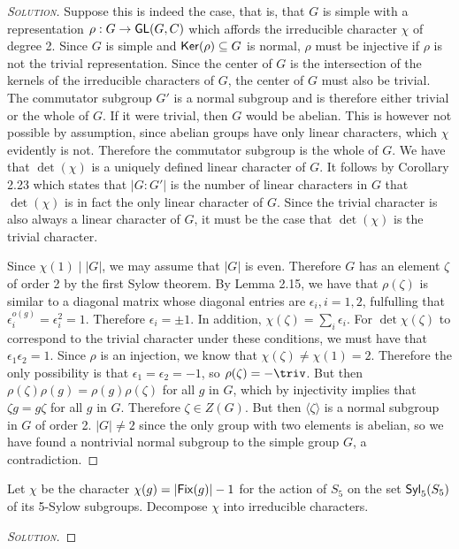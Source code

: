 \begin{proof}[{\scshape Solution}]
Suppose this is indeed the case, that is, that $G$ is simple with a representation $\rho: G \to \mathsf{GL}(G, C)$ which affords the irreducible character $\chi$ of degree 2. Since $G$ is simple and $\mathsf{Ker}(\rho) \subseteq G$ is normal, $\rho$ must be injective if $\rho$ is not the trivial representation. Since the center of $G$ is the intersection of the kernels of the irreducible characters of $G$, the center of $G$ must also be trivial. The commutator subgroup $G'$ is a normal subgroup and is therefore either trivial or the whole of $G$. If it were trivial, then $G$ would be abelian. This is however not possible by assumption, since abelian groups have only linear characters, which $\chi$ evidently is not. Therefore the commutator subgroup is the whole of $G$. We have that $\det(\chi)$ is a uniquely defined linear character of $G$. It follows by Corollary 2.23 which states that $\lvert G : G'\rvert$ is the number of linear characters in $G$ that $\det(\chi)$ is in fact the only linear character of $G$. Since the trivial character is also always a linear character of $G$, it must be the case that $\det(\chi)$ is the trivial character.

Since $\chi(1) \mid \lvert G \rvert$, we may assume that $\lvert G\rvert$ is even. Therefore $G$ has an element $\zeta$ of order 2 by the first Sylow theorem. By Lemma 2.15, we have that $\rho(\zeta)$ is similar to a diagonal matrix whose diagonal entries are $\epsilon_i, i = 1, 2$, fulfulling that $\epsilon_i^{o(g)} = \epsilon_i^{2} = 1$. Therefore $\epsilon_i = \pm 1$. In addition, $\chi(\zeta) = \sum_i \epsilon_i$. For $\det{\chi}(\zeta)$ to correspond to the trivial character under these conditions, we must have that $\epsilon_1\epsilon_2 = 1$. Since $\rho$ is an injection, we know that $\chi(\zeta) \neq \chi(1) = 2$. Therefore the only possibility is that $\epsilon_1 = \epsilon_2 = -1$, so $\rho(\zeta) = -\triv$. But then $\rho(\zeta)\rho(g) = \rho(g)\rho(\zeta)$ for all $g$ in $G$, which by injectivity implies that $\zeta g = g\zeta$ for all $g$ in $G$. Therefore $\zeta \in Z(G)$. But then $\langle \zeta \rangle$ is a normal subgroup in $G$ of order 2. $\lvert G \rvert \neq 2$ since the only group with two elements is abelian, so we have found a nontrivial normal subgroup to the simple group $G$, a contradiction.


\end{proof}

\newpage

\begin{problem}
Let $\chi$ be the character $\chi(g) = \lvert \mathsf{Fix}(g) \rvert -1$ for the action of $S_5$ on the set $\mathsf{Syl}_5(S_5)$ of its 5-Sylow subgroups. Decompose $\chi$ into irreducible characters.


\end{problem}

\begin{proof}[{\scshape Solution}]

\end{proof}





